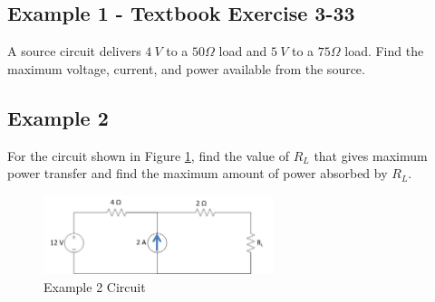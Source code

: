 \documentclass{handout}
\begin{document}
\subsection{Example 1 - Textbook Exercise 3-33}
A source circuit delivers $4\ V$ to a $50\Omega$ load and $5\ V$ to a $75\Omega$ load.  Find the maximum voltage, current, and power available from the source.

\newpage
\pagebreak
\clearpage

\subsection{Example 2}
For the circuit shown in Figure \ref{fig: Example2}, find the value of $R_L$ that gives maximum power transfer and find the maximum amount of power absorbed by $R_L$.
\begin{figure} [h t b]
\centering
\includegraphics[width=0.6\textwidth]{Example2.jpg}
\caption{Example 2 Circuit}
\label{fig: Example2}
\end{figure}
\end{document}
